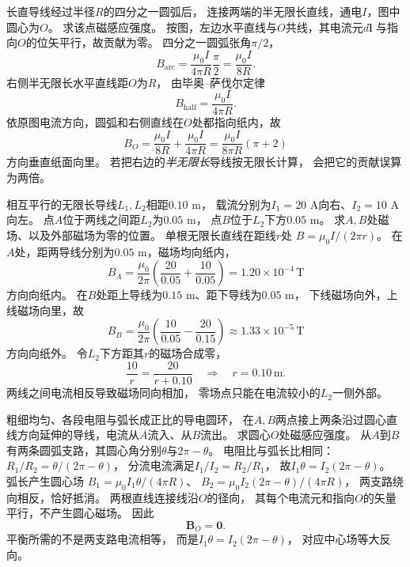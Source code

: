 \problemtext 长直导线经过半径$R$的四分之一圆弧后，
连接两端的半无限长直线，通电$I$，图中圆心为$O$。
求该点磁感应强度。
\workings
按图，左边水平直线与$O$共线，其电流元$d\bm l$
与指向$O$的位矢平行，故贡献为零。
四分之一圆弧张角$\pi/2$，
\[
B_{\mathrm{arc}}=\frac{\mu_0I}{4\pi R}\frac{\pi}{2}
=\frac{\mu_0I}{8R}.
\]
右侧半无限长水平直线距$O$为$R$，
由毕奥--萨伐尔定律
\[
B_{\mathrm{half}}=\frac{\mu_0I}{4\pi R}.
\]
依原图电流方向，圆弧和右侧直线在$O$处都指向纸内，故
\[
\boxed{B_O=\frac{\mu_0I}{8R}
+\frac{\mu_0I}{4\pi R}
=\frac{\mu_0I}{8\pi R}(\pi+2)}
\]
方向垂直纸面向里。
\crosscheck 若把右边的\emph{半无限长}导线按无限长计算，
会把它的贡献误算为两倍。

\problemtext 相互平行的无限长导线$L_1,L_2$相距$0.10$ m，
载流分别为$I_1=20$ A向右、$I_2=10$ A向左。
点$A$位于两线之间距$L_2$为$0.05$ m，
点$B$位于$L_2$下方$0.05$ m。
求$A,B$处磁场、以及外部磁场为零的位置。
\workings
单根无限长直线在距线$r$处
$B=\mu_0I/(2\pi r)$。
在$A$处，距两导线分别为$0.05$ m，磁场均向纸内，
\[
\boxed{B_A=\frac{\mu_0}{2\pi}
\left(\frac{20}{0.05}+\frac{10}{0.05}\right)
=1.20\times10^{-4}\,\mathrm T}
\]
方向向纸内。
在$B$处距上导线为$0.15$ m、距下导线为$0.05$ m，
下线磁场向外，上线磁场向里，故
\[
\boxed{B_B=\frac{\mu_0}{2\pi}
\left(\frac{10}{0.05}-\frac{20}{0.15}\right)
\approx1.33\times10^{-5}\,\mathrm T}
\]
方向向纸外。
令$L_2$下方距其$r$的磁场合成零，
\[
\frac{10}{r}=\frac{20}{r+0.10}
\quad\Longrightarrow\quad
\boxed{r=0.10\,\mathrm m}.
\]
\crosscheck 两线之间电流相反导致磁场同向相加，
零场点只能在电流较小的$L_2$一侧外部。

\problemtext 粗细均匀、各段电阻与弧长成正比的导电圆环，
在$A,B$两点接上两条沿过圆心直线方向延伸的导线，电流从$A$流入、从$B$流出。
求圆心$O$处磁感应强度。
\workings
从$A$到$B$有两条圆弧支路，其圆心角分别$\theta$与$2\pi-\theta$。
电阻比与弧长比相同：
$R_1/R_2=\theta/(2\pi-\theta)$，
分流电流满足$I_1/I_2=R_2/R_1$，
故$I_1\theta=I_2(2\pi-\theta)$。
弧长产生圆心场
$B_1=\mu_0I_1\theta/(4\pi R)$、
$B_2=\mu_0I_2(2\pi-\theta)/(4\pi R)$，
两支路绕向相反，恰好抵消。
两根直线连接线沿$O$的径向，
其每个电流元和指向$O$的矢量平行，不产生圆心磁场。
因此
\[
\boxed{\bm B_O=\bm0}.
\]
\crosscheck 平衡所需的不是两支路电流相等，
而是$I_1\theta=I_2(2\pi-\theta)$，
对应中心场等大反向。
